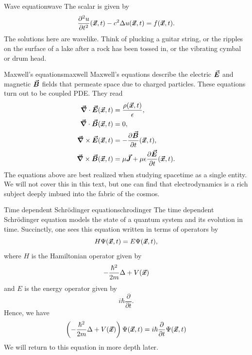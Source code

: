         \begin{ex}{Wave equation}{wave}
        The scalar  is given by
        \begin{equation}
        \label{eq:wave_eqn}
        \frac{\partial^2 u}{\partial t^2}(\boldsymbol{\vec{x}},t) -c^2\Delta u(\boldsymbol{\vec{x}},t) = f(\boldsymbol{\vec{x}},t).
        \end{equation}
        The solutions here are wavelike.  Think of plucking a guitar string, or the ripples on the surface of a lake after a rock has been tossed in, or the vibrating cymbal or drum head.
        \end{ex}
        
        \begin{ex}{Maxwell's equations}{maxwell}
        Maxwell's equations describe the electric $\boldsymbol{\vec{E}}$ and magnetic $\boldsymbol{\vec{B}}$ fields that permeate space due to charged particles.  These equations turn out to be coupled PDE.  They read
        \begin{align}
            \boldsymbol{\vec{\nabla}} \cdot \boldsymbol{\vec{E}}(\boldsymbol{\vec{x}},t) &= \frac{\rho(\boldsymbol{\vec{x}},t)}{\epsilon},\\
            \boldsymbol{\vec{\nabla}} \cdot \boldsymbol{\vec{B}}(\boldsymbol{\vec{x}},t) &= 0,\\
            \boldsymbol{\vec{\nabla}} \times \boldsymbol{\vec{E}}(\boldsymbol{\vec{x}},t) &= -\frac{\partial \boldsymbol{\vec{B}}}{\partial t}(\boldsymbol{\vec{x}},t),\\
            \boldsymbol{\vec{\nabla}} \times \boldsymbol{\vec{B}}(\boldsymbol{\vec{x}},t) &= \mu \boldsymbol{\vec{J}} + \mu \epsilon \frac{\partial \boldsymbol{\vec{E}}}{\partial t}(\boldsymbol{\vec{x}},t).
        \end{align}
        The equations above are best realized when studying spacetime as a single entity. We will not cover this in this text, but one can find that electrodynamics is a rich subject deeply imbued into the fabric of the cosmos.
        \end{ex}

        \begin{ex}{Time dependent Schr\"odinger equation}{schrodinger}
        The time dependent Schr\"odinger equation models the state of a quantum system and its evolution in time. Succinctly, one sees this equation written in terms of operators by
\begin{equation}
\label{eq:schrodinger_operator_eqn}
H \Psi(\boldsymbol{\vec{x}},t) = E \Psi(\boldsymbol{\vec{x}},t),
\end{equation}
  where $H$ is the Hamiltonian operator given by
\begin{equation}
-\frac{\hbar^2}{2m} \Delta + V(\boldsymbol{\vec{x}})
\end{equation}
and $E$ is the energy operator given by
        \begin{equation}
i\hbar \frac{\partial}{\partial t}.
\end{equation}
Hence, we have
\begin{equation}
\label{eq:schrodinger_time}
\left(-\frac{\hbar^2}{2m} \Delta + V(\boldsymbol{\vec{x}})\right) \Psi(\boldsymbol{\vec{x}},t) = i\hbar \frac{\partial}{\partial t} \Psi(\boldsymbol{\vec{x}},t)
\end{equation}
We will return to this equation in more depth later.
        \end{ex}
       
